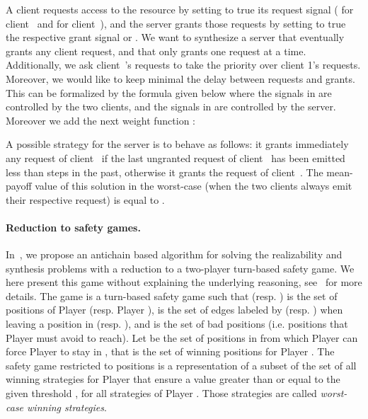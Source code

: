 \begin{example} \label{ex:ltl} 
A client requests access to the resource by setting to true its request signal ( for client~ and  for client~), and the server grants those requests by setting to true the respective grant signal  or . We want to synthesize a server that eventually grants any client request, and that only grants one request at a time. Additionally, we ask client~'s requests to take the priority over client 1's requests.  Moreover, we would like to keep minimal the delay between requests and grants. This can be formalized by the \LTL formula  given below where the signals in  are controlled by the two clients, and the signals in  are controlled by the server. Moreover we add the next weight function :

\begin{minipage}{0.5\linewidth}

\end{minipage}
\begin{minipage}{0.4\linewidth}
\begin{center}


\end{center}
\end{minipage}

\medskip\noindent
A possible strategy for the server is to behave as follows: it grants immediately any request of client~ if the last ungranted request of client~ has been emitted less than  steps in the past, otherwise it grants the request of client~. The mean-payoff value of this solution in the worst-case (when the two clients always emit their respective request) is equal to .
\end{example}

\paragraph{Reduction to safety games.} In~\cite{DBLP:journals/corr/abs-1210-3539,DBLP:conf/tacas/BohyBFR13}, we propose an antichain based algorithm for solving the  realizability and synthesis problems with a reduction to a two-player turn-based safety game. We here present this game  without explaining the underlying reasoning, see~\cite{DBLP:journals/corr/abs-1210-3539} for more details. The game  is a turn-based safety game such that  (resp. ) is the set of positions of Player  (resp. Player ),  is the set of edges labeled by  (resp. ) when leaving a position in  (resp. ), and  is the set of bad positions (i.e. positions that Player  must avoid to reach). Let  be the set of positions in  from which Player  can force Player  to stay in , that is the set of winning positions for Player . The safety game  restricted to positions  is a representation of a subset of the set of all winning strategies  for Player  that ensure a value  greater than or equal to the given threshold , for all strategies  of Player . Those strategies are called \textit{worst-case winning strategies}. 

